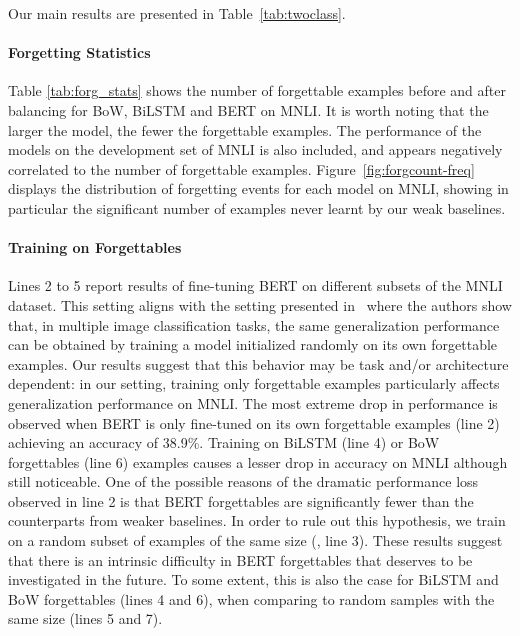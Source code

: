 Our main results are presented in Table~\ref{tab:twoclass}.

\paragraph{Forgetting Statistics} Table \ref{tab:forg_stats} shows the number of forgettable examples before and after balancing for BoW, BiLSTM and BERT on MNLI. It is worth noting that the larger the model, the fewer the forgettable examples. The performance of the models on the development set of MNLI is also included, and appears negatively correlated to the number of forgettable examples. Figure~\ref{fig:forgcount-freq} displays the distribution of forgetting events for each model on MNLI, showing in particular the significant number of examples never learnt by our weak baselines.

\paragraph{Training on Forgettables} Lines 2 to 5 report results of fine-tuning BERT on different subsets of the MNLI dataset. This setting aligns with the setting presented in~\citet{toneva2018empirical} where the authors show that, in multiple image classification tasks, the same generalization performance can be obtained by training a model initialized randomly on its own forgettable examples. Our results suggest that this behavior may be task and/or architecture dependent: in our setting, training only forgettable examples particularly affects generalization performance on MNLI. The most extreme drop in performance is observed when BERT is only fine-tuned on its own forgettable examples (line 2) achieving an accuracy of 38.9\%. Training on BiLSTM (line 4) or BoW forgettables (line 6) examples causes a lesser drop in accuracy on MNLI although still noticeable. One of the possible reasons of the dramatic performance loss observed in line 2 is that BERT forgettables are significantly fewer than the counterparts from weaker baselines. 
In order to rule out this hypothesis, we train on a random subset of examples of the same size (\balancedbert, line 3). These results suggest that there is an intrinsic difficulty in BERT forgettables that deserves to be investigated in the future.
To some extent, this is also the case for BiLSTM and BoW forgettables (lines 4 and 6), when comparing to random samples with the same size (lines 5 and 7).

